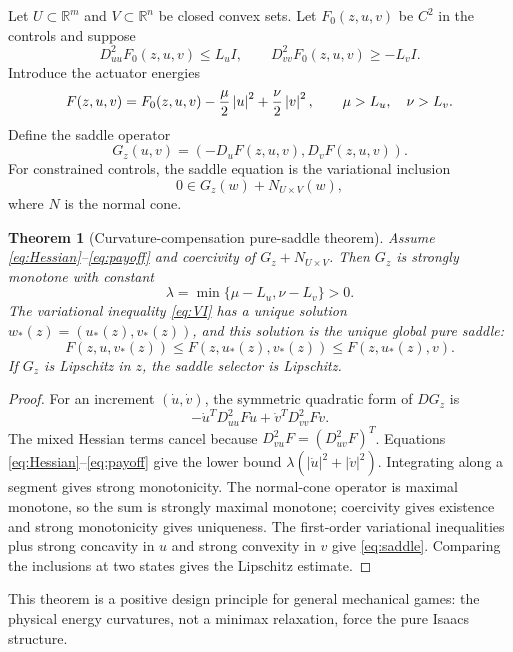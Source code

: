 \documentclass[11pt,reqno]{amsart}
\newtheorem{theorem}{Theorem}[section]
\theoremstyle{definition}
\theoremstyle{remark}
\newcommand{\R}{\mathbb R}
\newcommand{\abs}[1]{\left\lvert #1\right\rvert}
\begin{document}
Let $U\subset\R^m$ and $V\subset\R^n$ be closed convex sets.  Let
$F_0(z,u,v)$ be $C^2$ in the controls and suppose
\begin{equation}\label{eq:Hessian}
 D_{uu}^2F_0(z,u,v)\le L_uI,
 \qquad
 D_{vv}^2F_0(z,u,v)\ge-L_vI.
\end{equation}
Introduce the actuator energies
\begin{equation}\label{eq:payoff}
 F(z,u,v)=F_0(z,u,v)-{\mu\over2}\abs u^2
 +{\nu\over2}\abs v^2,
 \qquad \mu>L_u,\quad\nu>L_v.
\end{equation}
Define the saddle operator
\[
 G_z(u,v)=(-D_uF(z,u,v),D_vF(z,u,v)).
\]
For constrained controls, the saddle equation is the variational inclusion
\begin{equation}\label{eq:VI}
 0\in G_z(w)+N_{U\times V}(w),
\end{equation}
where $N$ is the normal cone.

\begin{theorem}[Curvature-compensation pure-saddle theorem]\label{thm:curvature}
Assume \eqref{eq:Hessian}--\eqref{eq:payoff} and coercivity of
$G_z+N_{U\times V}$.  Then $G_z$ is strongly monotone with constant
\[
 \lambda=\min\{\mu-L_u,\nu-L_v\}>0.
\]
The variational inequality \eqref{eq:VI} has a unique solution
$w_*(z)=(u_*(z),v_*(z))$, and this solution is the unique global pure saddle:
\begin{equation}\label{eq:saddle}
 F(z,u,v_*(z))\le F(z,u_*(z),v_*(z))
 \le F(z,u_*(z),v).
\end{equation}
If $G_z$ is Lipschitz in $z$, the saddle selector is Lipschitz.
\end{theorem}

\begin{proof}
For an increment $(\dot u,\dot v)$, the symmetric quadratic form of $DG_z$
is
\[
 -\dot u^TD_{uu}^2F\dot u+
 \dot v^TD_{vv}^2F\dot v.
\]
The mixed Hessian terms cancel because
$D_{vu}^2F=(D_{uv}^2F)^T$.  Equations
\eqref{eq:Hessian}--\eqref{eq:payoff} give the lower bound
$\lambda(\abs{\dot u}^2+\abs{\dot v}^2)$.  Integrating along a segment gives
strong monotonicity.  The normal-cone operator is maximal monotone, so the sum
is strongly maximal monotone; coercivity gives existence and strong
monotonicity gives uniqueness.  The first-order variational inequalities plus
strong concavity in $u$ and strong convexity in $v$ give
\eqref{eq:saddle}.  Comparing the inclusions at two states gives the Lipschitz
estimate.
\end{proof}

This theorem is a positive design principle for general mechanical games: the
physical energy curvatures, not a minimax relaxation, force the pure Isaacs
structure.
\end{document}
